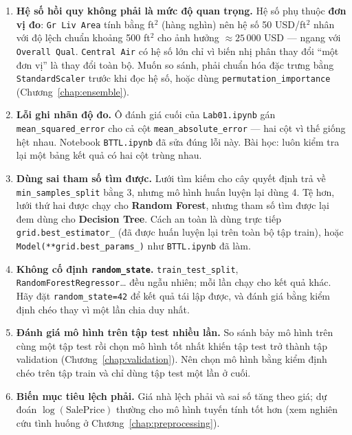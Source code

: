\begin{enumerate}
    \item \textbf{Hệ số hồi quy không phải là mức độ quan trọng.} Hệ số phụ thuộc \textbf{đơn vị đo}: \texttt{Gr Liv Area} tính bằng ft$^2$ (hàng nghìn) nên hệ số 50 USD/ft$^2$ nhân với độ lệch chuẩn khoảng 500 ft$^2$ cho ảnh hưởng $\approx 25\,000$ USD --- ngang với \texttt{Overall Qual}. \texttt{Central Air} có hệ số lớn chỉ vì biến nhị phân thay đổi ``một đơn vị'' là thay đổi toàn bộ. Muốn so sánh, phải chuẩn hóa đặc trưng bằng \texttt{StandardScaler} trước khi đọc hệ số, hoặc dùng \texttt{permutation\_importance} (Chương~\ref{chap:ensemble}).
    \item \textbf{Lỗi ghi nhãn độ đo.} Ô đánh giá cuối của \texttt{Lab01.ipynb} gán \texttt{mean\_squared\_error} cho cả cột \texttt{mean\_absolute\_error} --- hai cột vì thế giống hệt nhau. Notebook \texttt{BTTL.ipynb} đã sửa đúng lỗi này. Bài học: luôn kiểm tra lại một bảng kết quả có hai cột trùng nhau.
    \item \textbf{Dùng sai tham số tìm được.} Lưới tìm kiếm cho cây quyết định trả về \texttt{min\_samples\_split} bằng 3, nhưng mô hình huấn luyện lại dùng 4. Tệ hơn, lưới thứ hai được chạy cho \textbf{Random Forest}, nhưng tham số tìm được lại đem dùng cho \textbf{Decision Tree}. Cách an toàn là dùng trực tiếp \texttt{grid.best\_estimator\_} (đã được huấn luyện lại trên toàn bộ tập train), hoặc \texttt{Model(**grid.best\_params\_)} như \texttt{BTTL.ipynb} đã làm.
    \item \textbf{Không cố định \texttt{random\_state}.} \texttt{train\_test\_split}, \texttt{RandomForestRegressor}\ldots{} đều ngẫu nhiên; mỗi lần chạy cho kết quả khác. Hãy đặt \texttt{random\_state=42} để kết quả tái lập được, và đánh giá bằng kiểm định chéo thay vì một lần chia duy nhất.
    \item \textbf{Đánh giá mô hình trên tập test nhiều lần.} So sánh bảy mô hình trên cùng một tập test rồi chọn mô hình tốt nhất khiến tập test trở thành tập validation (Chương~\ref{chap:validation}). Nên chọn mô hình bằng kiểm định chéo trên tập train và chỉ dùng tập test một lần ở cuối.
    \item \textbf{Biến mục tiêu lệch phải.} Giá nhà lệch phải và sai số tăng theo giá; dự đoán $\log(\text{SalePrice})$ thường cho mô hình tuyến tính tốt hơn (xem nghiên cứu tình huống ở Chương~\ref{chap:preprocessing}).
\end{enumerate}

